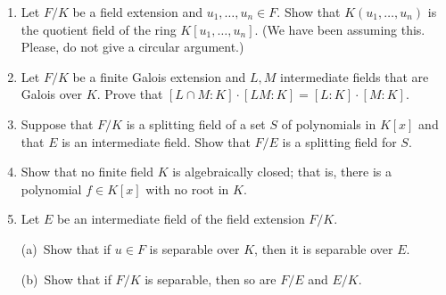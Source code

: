 \documentclass[12pt]{article}
\begin{document}
\begin{enumerate}


\item  Let $F/K$ be a field extension and $u_1,\dotsc,u_n\in F$.
  Show that $K(u_1,\dotsc,u_n)$ is the quotient field of the ring $K[u_1,\dotsc,u_n]$.
  (We have been assuming this.  Please, do not give a circular argument.)
\vspace{-2pt}

\item  Let $F/K$ be a finite Galois extension and $L,M$ intermediate fields that are Galois over $K$.\newline
   Prove that $[L\cap M\colon K]\cdot [LM\colon K]=[L\colon K]\cdot [M\colon K]$.
\vspace{-2pt}


\item  Suppose that $F/K$ is a splitting field of a set $S$ of polynomials in $K[x]$ and
  that $E$ is an intermediate field.
  Show that $F/E$ is a splitting field for $S$. 
  \vspace{-2pt}


\item    Show that no finite field $K$ is algebraically closed; that is, there is a polynomial $f\in K[x]$ with no root in $K$.
        \vspace{-2pt}

\item   Let $E$ be an intermediate field of the field extension $F/K$.

  (a)\ Show that if $u\in F$ is separable over $K$, then it is separable over $E$.

  (b)\ Show that if $F/K$ is separable, then so are $F/E$ and $E/K$.
  \vspace{-2pt}



\end{enumerate}
\end{document}
